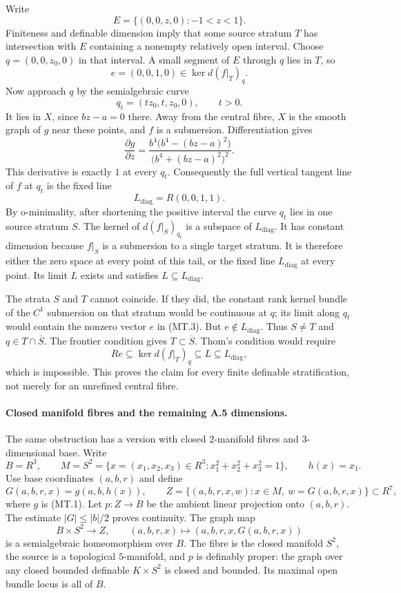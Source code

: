 Write
\[
 E=\{(0,0,z,0):-1<z<1\}.
\]
Finiteness and definable dimension imply that some source stratum
$T$ has intersection with $E$ containing a nonempty relatively
open interval. Choose $q=(0,0,z_0,0)$ in that interval. A small
segment of $E$ through $q$ lies in $T$, so
\[
 e=(0,0,1,0)\in\ker d(f|_T)_q.
 \tag{MT.3}
\]
Now approach $q$ by the semialgebraic curve
\[
 q_t=(tz_0,t,z_0,0),\qquad t>0.
 \tag{MT.4}
\]
It lies in $X$, since $bz-a=0$ there. Away from the central
fibre, $X$ is the smooth graph of $g$ near these points, and
$f$ is a submersion. Differentiation gives
\[
 \frac{\partial g}{\partial z}
 =\frac{b^4\bigl(b^4-(bz-a)^2\bigr)}
              {\bigl(b^4+(bz-a)^2\bigr)^2}.
\]
This derivative is exactly $1$ at every $q_t$. Consequently the
full vertical tangent line of $f$ at $q_t$ is the fixed line
\[
 L_\mathrm{diag}=R(0,0,1,1).
 \tag{MT.5}
\]
By o-minimality, after shortening the positive interval the curve
$q_t$ lies in one source stratum $S$. The kernel of
$d(f|_S)_{q_t}$ is a subspace of $L_\mathrm{diag}$. It has constant
dimension because $f|_S$ is a submersion to a single target stratum.
It is therefore either the zero space at every point of this tail,
or the fixed line $L_\mathrm{diag}$ at every point. Its limit $L$
exists and satisfies $L\subseteq L_\mathrm{diag}$.

The strata $S$ and $T$ cannot coincide. If they did, the constant
rank kernel bundle of the $C^1$ submersion on that stratum would be
continuous at $q$; its limit along $q_t$ would contain the nonzero
vector $e$ in (MT.3). But $e\notin L_\mathrm{diag}$.
Thus $S\ne T$ and $q\in T\cap\overline S$. The frontier condition
gives $T\subset\overline S$. Thom's condition would require
\[
 Re\subseteq\ker d(f|_T)_q\subseteq L
                 \subseteq L_\mathrm{diag},
\]
which is impossible. This proves the claim for every finite
definable stratification, not merely for an unrefined central fibre.

\paragraph{Closed manifold fibres and the remaining A.5 dimensions.}
The same obstruction has a version with closed $2$-manifold fibres
and $3$-dimensional base. Write
\[
 B=R^3,\qquad
 M=S^2=\{x=(x_1,x_2,x_3)\in R^3:x_1^2+x_2^2+x_3^2=1\},
 \qquad h(x)=x_1.
\]
Use base coordinates $(a,b,r)$ and define
\[
 G(a,b,r,x)=g(a,b,h(x)),\qquad
 Z=\{(a,b,r,x,w):x\in M,\ w=G(a,b,r,x)\}\subset R^7,
 \tag{MT.6}
\]
where $g$ is (MT.1). Let $p:Z\to B$ be the ambient linear
projection onto $(a,b,r)$. The estimate $|G|\le |b|/2$ proves
continuity. The graph map
\[
 B\times S^2\longrightarrow Z,\qquad
 (a,b,r,x)\longmapsto(a,b,r,x,G(a,b,r,x))
 \tag{MT.7}
\]
is a semialgebraic homeomorphism over $B$. The fibre is the closed
manifold $S^2$, the source is a topological $5$-manifold, and $p$
is definably proper: the graph over any closed bounded definable
$K\times S^2$ is closed and bounded. Its maximal open bundle
locus is all of $B$.

